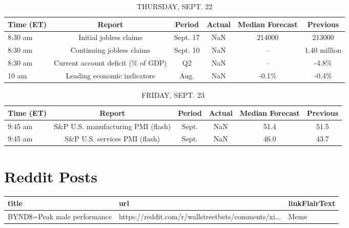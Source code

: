 \documentclass{article}%
\begin{document}
%


\begin{table}[htbp]%
\caption{THURSDAY, SEPT. 22}%
\centering%
\begin{adjustbox}{width=1\textwidth}%
\begin{tabular}{lccccc}
\toprule
Time (ET) &                             Report &   Period & Actual & Median Forecast &     Previous \\
\midrule
  8:30 am &             Initial jobless claims & Sept. 17 &    NaN &          214000 &       213000 \\
  8:30 am &          Continuing jobless claims & Sept. 10 &    NaN &              -- & 1.40 million \\
  8:30 am & Current account deficit (\% of GDP) &       Q2 &    NaN &              -- &        -4.8\% \\
    10 am &        Leading economic indicators &     Aug. &    NaN &           -0.1\% &        -0.4\% \\
\bottomrule
\end{tabular}
%
\end{adjustbox}%
\end{table}

%


\begin{table}[htbp]%
\caption{FRIDAY, SEPT. 23}%
\centering%
\begin{adjustbox}{width=1\textwidth}%
\begin{tabular}{lccccc}
\toprule
Time (ET) &                             Report & Period & Actual & Median Forecast & Previous \\
\midrule
  9:45 am & S\&P U.S. manufacturing PMI (flash) &  Sept. &    NaN &            51.4 &     51.5 \\
  9:45 am &      S\&P U.S. services PMI (flash) &  Sept. &    NaN &            46.0 &     43.7 \\
\bottomrule
\end{tabular}
%
\end{adjustbox}%
\end{table}

%
\section{Reddit Posts}%
\label{sec:RedditPosts}%


\begin{table}[htbp]%
\centering%
\begin{adjustbox}{width=1\textwidth}%
\begin{tabular}{lll}
\toprule
                      title &                                                url & linkFlairText \\
\midrule
BYND\$=Peak male performance & https://reddit.com/r/wallstreetbets/comments/xi... &          Meme \\
\bottomrule
\end{tabular}
%
\end{adjustbox}%
\end{table}

%
\end{document}
